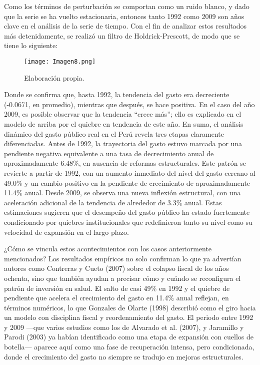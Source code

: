 \documentclass[12pt]{article}
\begin{document}
\bigskip
\bigskip
\bigskip
\bigskip
\bigskip
\bigskip
\bigskip
\bigskip
\bigskip
\bigskip
\bigskip
\bigskip
\bigskip
\bigskip
\bigskip
\bigskip

Como los términos de perturbación se comportan como un ruido blanco, y dado que la serie se ha vuelto estacionaria, entonces tanto 1992 como 2009 son años clave en el análisis de la serie de tiempo. Con el fin de analizar estos resultados más detenidamente, se realizó un filtro de Holdrick-Prescott, de modo que se tiene lo siguiente:

\begin{figure}[H]
\par\vspace{0.8em}
\texttt{[image: Imagen8.png]}

{\footnotesize Elaboración propia.}
\end{figure}

Donde se confirma que, hasta 1992, la tendencia del gasto era decreciente (-0.0671, en promedio), mientras que después, se hace positiva. En el caso del año 2009, es posible observar que la tendencia “crece más”; ello es explicado en el modelo de arriba por el quiebre en tendencia de este año. En suma, el análisis dinámico del gasto público real en el Perú revela tres etapas claramente diferenciadas. Antes de 1992, la trayectoria del gasto estuvo marcada por una pendiente negativa equivalente a una tasa de decrecimiento anual de aproximadamente 6.48\%, en ausencia de reformas estructurales. Este patrón se revierte a partir de 1992, con un aumento inmediato del nivel del gasto cercano al 49.0\% y un cambio positivo en la pendiente de crecimiento de aproximadamente 11.4\% anual. Desde 2009, se observa una nueva inflexión estructural, con una aceleración adicional de la tendencia de alrededor de 3.3\% anual. Estas estimaciones sugieren que el desempeño del gasto público ha estado fuertemente condicionado por quiebres institucionales que redefinieron tanto su nivel como su velocidad de expansión en el largo plazo.

¿Cómo se vincula estos acontecimientos con los casos anteriormente mencionados? Los resultados empíricos no solo confirman lo que ya advertían autores como Contreras y Cueto (2007) sobre el colapso fiscal de los años ochenta, sino que también ayudan a precisar cómo y cuándo se reconfigura el patrón de inversión en salud. El salto de casi 49\% en 1992 y el quiebre de pendiente que acelera el crecimiento del gasto en 11.4\% anual reflejan, en términos numéricos, lo que Gonzales de Olarte (1998) describió como el giro hacia un modelo con disciplina fiscal y reordenamiento del gasto. El periodo entre 1992 y 2009 —que varios estudios como los de Alvarado et al. (2007), y Jaramillo y Parodi (2003) ya habían identificado como una etapa de expansión con cuellos de botella— aparece aquí como una fase de recuperación intensa, pero condicionada, donde el crecimiento del gasto no siempre se tradujo en mejoras estructurales.
\end{document}
